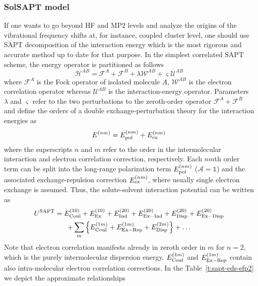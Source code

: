 \documentclass[a4paper,titlepage,twoside,fleqn,12pt]{book}
\begin{document}
\begin{refsection}
\subsubsection{SolSAPT model}

If one wants to go beyond HF and MP2 levels and
analyze the origins of the vibrational frequency 
shifts at, for instance, coupled cluster
level, one should use SAPT decomposition of the interaction
energy which is
the most rigorous and accurate method up to date for that purpose.
In the simplest correlated SAPT scheme, the energy operator
is partitioned as follows
%
\begin{equation}
 \mathscr{H}^{AB} = \mathscr{F}^{A} + \mathscr{F}^{B} + \lambda \mathscr{W}^{AB} + \varsigma \mathscr{U}^{AB}
\end{equation}
%
where $\mathscr{F}^{A}$ is the Fock operator of isolated molecule $A$, 
$\mathscr{W}^{AB}$ is the electron correlation operator 
whereas $\mathscr{U}^{AB}$ is the interaction\hyp{}energy operator.
Parameters $\lambda$ and $\varsigma$ refer to the two perturbations
to the zeroth\hyp{}order operator $\mathscr{F}^{A}+\mathscr{F}^{B}$
and define the orders of a double exchange\hyp{}perturbation theory
for the interaction energies as
%
\begin{equation}
  E^{(nm)} =  E^{(nm)}_{\rm pol} +  E^{(nm)}_{\rm ex}
\end{equation}
%
where the superscripts $n$ and $m$ refer to the order in the
intermolecular interaction and electron correlation correction,
respectively. Each $nm$th order term can be split into the long\hyp{}range
polarization term $E^{(nm)}_{\rm pol}$ ($\mathscr{A}=\mathbb{1}$)
and the associated exchange\hyp{}repulsion correction $E^{(nm)}_{\rm ex}$,
where usually single electron exchange is assumed.
Thus, the solute\hyp{}solvent interaction potential can be written as
%
\begin{multline}
U^{\rm SAPT} =
         E^{(10)}_{\rm Coul} + E^{(10)}_{\rm Ex} + 
         E^{(20)}_{\rm Ind}  + E^{(20)}_{\rm Ex-Ind} +
         E^{(20)}_{\rm Disp} + E^{(20)}_{\rm Ex-Disp} \\ +
     \sum_m \left\{ E^{(1m)}_{\rm Coul} + E^{(1m)}_{\rm Ex-Rep} + E^{(2m)}_{\rm Disp}\right\} 
     + \ldots
\end{multline}
%
Note that electron correlation manifests
already in zeroth order in $m$ for $n=2$, which is the purely intermolecular
dispersion energy. $E^{(1m)}_{\rm Coul}$ and $E^{(1m)}_{\rm Ex-Rep}$
contain also intra\hyp{}molecular electron correlation corrections.
In the Table~\ref{t:sapt-eds-efp2} we depict the approximate relationships

\end{refsection}
\end{document}
